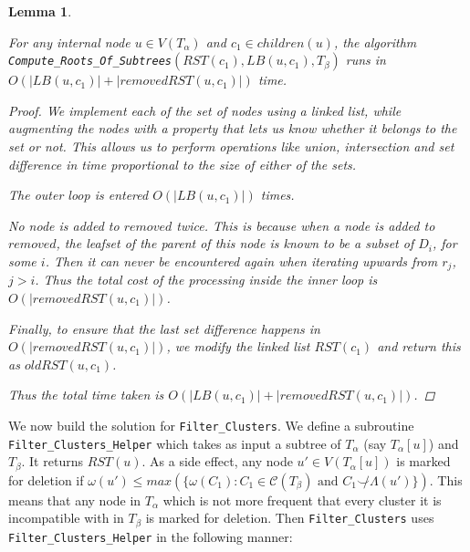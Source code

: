 \documentclass{article}
\newcommand{\compatible}{\smile}
\newcommand{\leafset}{\Lambda}
\newcommand{\weight}{\omega}
\newtheorem{computerootsofsubtreesruntime}[incompatibility]{Lemma}
\begin{document}
    \begin{computerootsofsubtreesruntime}
        \label{lem:computerootsofsubtreesruntime}

        For any internal node $u \in V(T_\alpha)$ and $c_1 \in children(u)$, the algorithm\\ %
        \texttt{Compute\_Roots\_Of\_Subtrees}$(RST(c_1), LB(u, c_1), T_\beta)$ runs in\\ %
        $O(|LB(u, c_1)| + |removedRST(u, c_1)|)$ time.

        \begin{proof}
            We implement each of the set of nodes using a linked list, while augmenting the nodes with a property that lets us know whether it belongs to the set or not. This allows us to perform operations like union, intersection and set difference in time proportional to the size of either of the sets.

            The outer loop is entered $O(|LB(u, c_1)|)$ times.

            No node is added to $removed$ twice. This is because when a node is added to $removed$, the leafset of the parent of this node is known to be a subset of $D_i$, for some $i$. Then it can never be encountered again when iterating upwards from $r_j$, $j > i$. Thus the total cost of the processing inside the inner loop is $O(|removedRST(u, c_1)|)$.

            Finally, to ensure that the last set difference happens in $O(|removedRST(u, c_1)|)$, we modify the linked list $RST(c_1)$ and return this as $oldRST(u, c_1)$.

            Thus the total time taken is $O(|LB(u, c_1)| + |removedRST(u, c_1)|)$.
        \end{proof}
    \end{computerootsofsubtreesruntime}

    We now build the solution for \texttt{Filter\_Clusters}. We define a subroutine \texttt{Filter\_Clusters\_Helper} which takes as input a subtree of $T_\alpha$ (say $T_\alpha[u]$) and $T_\beta$. It returns $RST(u)$. As a side effect, any node $u' \in V(T_\alpha[u])$ is marked for deletion if $\weight(u') \leq max(\{\weight(C_1) : C_1 \in \mathcal{C}(T_\beta) \text{ and } C_1 \not\compatible \leafset(u')\})$. This means that any node in $T_\alpha$ which is not more frequent that every cluster it is incompatible with in $T_\beta$ is marked for deletion. Then \texttt{Filter\_Clusters} uses \texttt{Filter\_Clusters\_Helper} in the following manner:
\end{document}
